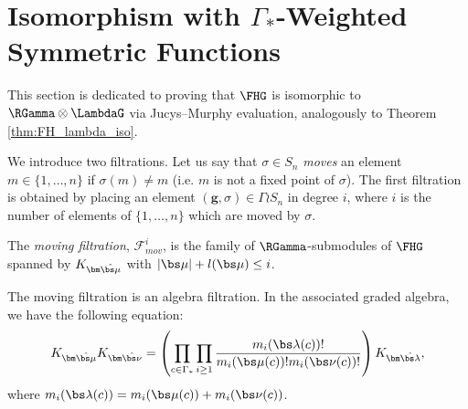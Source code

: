 \section{Isomorphism with \texorpdfstring{$\Gamma_*$}{Gamma*}-Weighted Symmetric Functions}\label{sec:6}

This section is dedicated to proving that $\FHG$ is isomorphic to $\RGamma \otimes \LambdaG$ via Jucys--Murphy evaluation, analogously to Theorem \ref{thm:FH_lambda_iso}.

We introduce two filtrations. Let us say that $\sigma \in S_n$ \emph{moves} an element $m \in \{1,\ldots, n\}$ if $\sigma(m) \neq m$ (i.e. $m$ is not a fixed point of $\sigma$). The first filtration is obtained by placing an element $(\mathbf{g}, \sigma) \in \Gamma \wr S_n$ in degree $i$, where $i$ is the number of elements of $\{1, \ldots, n\}$ which are moved by $\sigma$. 
\begin{definition}
The \emph{moving filtration}, $\mathcal{F}_{mov}^i$, is the family of $\RGamma$-submodules of $\FHG$ spanned by $K_{\bm\hat{\bs \mu}}$ with $|\bs \mu| + l(\bs \mu) \leq i$.
\end{definition}

\begin{proposition} \label{moving_filt_prop}
The moving filtration is an algebra filtration. In the associated graded algebra, we have the following equation:
\[
K_{\bm\hat{\bs \mu}}K_{\bm\hat{\bs \nu}} = \left( \prod_{c \in \Gamma_*} \prod_{i \geq 1} \frac{m_i(\bs\lambda(c))!}{m_i(\bs\mu(c))!m_i(\bs\nu(c))!}\right) K_{\bm\hat{\bs \lambda}},
\]
where $m_i(\bs\lambda(c)) = m_i(\bs\mu(c)) + m_i(\bs\nu(c))$.
\end{proposition}

